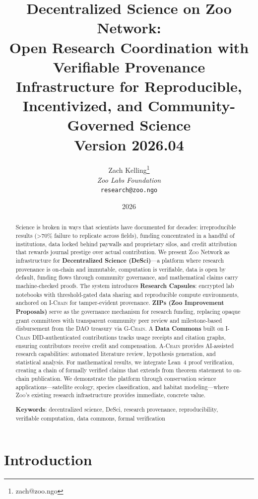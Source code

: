 \documentclass[11pt,letterpaper]{article}
\title{\textbf{Decentralized Science on Zoo Network:\\Open Research Coordination with Verifiable Provenance}\\
\large Infrastructure for Reproducible, Incentivized, and Community-Governed Science\\
\vspace{5pt}
\normalsize Version 2026.04}
\author{
Zach Kelling\thanks{zach@zoo.ngo}\\
\textit{Zoo Labs Foundation}\\
\texttt{research@zoo.ngo}
}
\date{2026}
\theoremstyle{definition}
\theoremstyle{remark}
\newcommand{\Zoo}{\textsc{Zoo}}
\newcommand{\AChain}{\textsc{A-Chain}}
\newcommand{\IChain}{\textsc{I-Chain}}
\newcommand{\GChain}{\textsc{G-Chain}}
\newcommand{\DID}{\textsc{DID}}
\newcommand{\DAO}{\textsc{DAO}}
\begin{document}
\zoocoverpage

\begin{abstract}
Science is broken in ways that scientists have documented for decades: irreproducible results (\textgreater 70\% failure to replicate across fields), funding concentrated in a handful of institutions, data locked behind paywalls and proprietary silos, and credit attribution that rewards journal prestige over actual contribution. We present \Zoo{} Network as infrastructure for \textbf{Decentralized Science (DeSci)}---a platform where research provenance is on-chain and immutable, computation is verifiable, data is open by default, funding flows through community governance, and mathematical claims carry machine-checked proofs. The system introduces \textbf{Research Capsules}: encrypted lab notebooks with threshold-gated data sharing and reproducible compute environments, anchored on \IChain{} for tamper-evident provenance. \textbf{ZIPs (Zoo Improvement Proposals)} serve as the governance mechanism for research funding, replacing opaque grant committees with transparent community peer review and milestone-based disbursement from the \DAO{} treasury via \GChain{}. A \textbf{Data Commons} built on \IChain{} \DID{}-authenticated contributions tracks usage receipts and citation graphs, ensuring contributors receive credit and compensation. \AChain{} provides AI-assisted research capabilities: automated literature review, hypothesis generation, and statistical analysis. For mathematical results, we integrate Lean~4 proof verification, creating a chain of formally verified claims that extends from theorem statement to on-chain publication. We demonstrate the platform through conservation science applications---satellite ecology, species classification, and habitat modeling---where \Zoo{}'s existing research infrastructure provides immediate, concrete value.

\textbf{Keywords}: decentralized science, DeSci, research provenance, reproducibility, verifiable computation, data commons, formal verification
\end{abstract}

\tableofcontents
\newpage

\section{Introduction}
\label{sec:intro}
\end{document}
